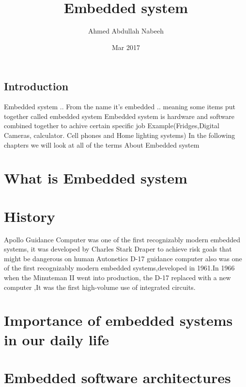 \documentclass[a4paper,12pt]{book}
\begin{document}
	
	\author{Ahmed Abdullah Nabeeh}
	\title{Embedded system}
	\date{Mar 2017}
	\maketitle
	\tableofcontents
		
	\section{Introduction}
	
	Embedded system ..
	From the name it's embedded .. meaning some items put together called embedded system  \newline
	Embedded system is hardware and software combined together to achive certain specific job 
	\newline Example(Fridges,Digital Cameras,
	calculator.
	Cell phones and
	Home lighting systems) \newline
	In the following chapters we will look at all of the terms About Embedded system
	
	\chapter
	{What is Embedded system}
	
	
	\chapter
	{History}
	Apollo Guidance Computer was one of the first recognizably modern embedded systems, it was developed by Charles Stark Draper to achieve risk goals that might be dangerous on human \newline
	 Autonetics D-17 guidance computer also was one of the first recognizably modern embedded systems,developed in 1961.In 1966 when the Minuteman II went into production, the D-17  replaced with a new computer ,It was the first high-volume use of integrated circuits.
	\chapter 
	{Importance of embedded systems in our daily life }
	\chapter
	{Embedded software architectures}
	\frontmatter
	\maketitle
	
	
	\mainmatter
\end{document}

